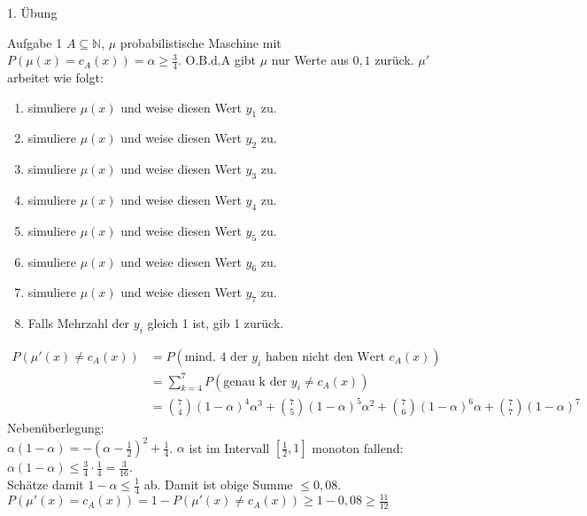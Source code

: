 \begin{section}{1. Übung}
  \begin{subsection}{Aufgabe 1}
  \(A \subseteq \mathbb{N}\), \(\mu\) probabilistische Maschine mit \(P(\mu(x)=c_A(x)) = \alpha \geq \frac{3}{4}\). O.B.d.A gibt \(\mu\) nur Werte aus \({0,1}\) zurück.
  \(\mu'\) arbeitet wie folgt:
  \begin{enumerate}
   \item simuliere \(\mu(x)\) und weise diesen Wert \(y_1\) zu.
   \item simuliere \(\mu(x)\) und weise diesen Wert \(y_2\) zu.
   \item simuliere \(\mu(x)\) und weise diesen Wert \(y_3\) zu.
   \item simuliere \(\mu(x)\) und weise diesen Wert \(y_4\) zu.
   \item simuliere \(\mu(x)\) und weise diesen Wert \(y_5\) zu.
   \item simuliere \(\mu(x)\) und weise diesen Wert \(y_6\) zu.
   \item simuliere \(\mu(x)\) und weise diesen Wert \(y_7\) zu.
   \item Falls Mehrzahl der \(y_i\) gleich 1 ist, gib 1 zurück.
  \end{enumerate}
  \begin{align*}
    P(\mu'(x) \neq c_A(x)) & = P(\text{mind. 4 der }y_i\text{ haben nicht den Wert }c_A(x)) 
    \\ & = \sum_{k=4}^7 P(\text{genau k der }y_i \neq c_A(x))  
    \\ & = \binom{7}{4}(1-\alpha)^4\alpha^3 + \binom{7}{5}(1-\alpha)^5\alpha^2 + \binom{7}{6}(1-\alpha)^6\alpha + \binom{7}{7} (1-\alpha)^7
  \end{align*}
  Nebenüberlegung: \\
  \(\alpha(1-\alpha) = -(\alpha - \frac{1}{2})^2 + \frac{1}{4}\). \(\alpha\) ist im Intervall \([\frac{1}{2},1]\) monoton fallend:  \\
  \(\alpha(1-\alpha) \leq \frac{3}{4}\cdot\frac{1}{4} = \frac{3}{16}\).\\
  Schätze damit \(1-\alpha \leq \frac{1}{4}\) ab. Damit ist obige Summe \(\leq 0,08\).\\
  \(P(\mu'(x) = c_A(x)) = 1 - P(\mu'(x) \neq c_A(x)) \geq 1 -0,08 \geq \frac{11}{12}\)

  
  \end{subsection}


\end{section}
